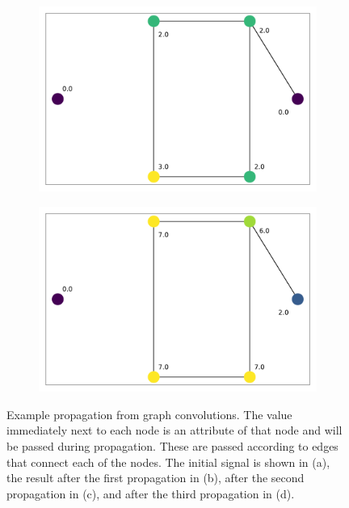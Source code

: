 \documentclass[../thesis.tex]{subfiles}
\begin{document}
\begin{figure}[t]
\begin{subfigure}{0.45\textwidth}
		\caption{}
		\label{fig:prop-ex-1}
	\end{subfigure}
	\begin{subfigure}{0.45\textwidth}
		\includegraphics[width=\textwidth]{figures/graph_signal-02.pdf}
		\caption{}
		\label{fig:prop-ex-2}
	\end{subfigure}
	\begin{subfigure}{0.45\textwidth}
		\includegraphics[width=\textwidth]{figures/graph_signal-03.pdf}
		\caption{}
		\label{fig:prop-ex-3}
	\end{subfigure}
	\caption{
	Example propagation from graph convolutions.
	The value immediately next to each node is an attribute of that node and will be passed during propagation.
	These are passed according to edges that connect each of the nodes.
	The initial signal is shown in (a), the result after the first propagation in (b), after the second propagation in (c), and after the third propagation in (d).
	}
	\label{fig:prop-ex}
\end{figure}
\end{document}
